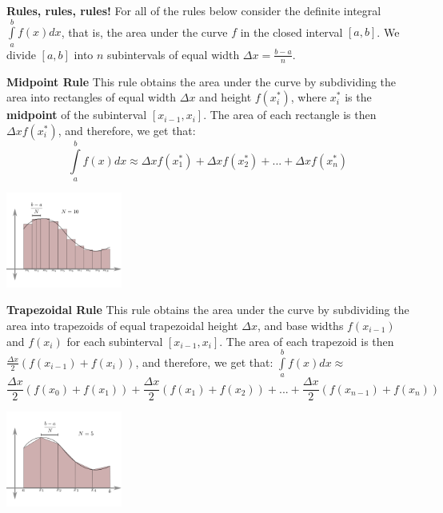 \documentclass[xcolor=dvipsnames]{beamer}
\begin{document}
\begin{frame}[fragile]
{\bf Rules, rules, rules!}
For all of the rules below consider the definite integral $\int\limits_a^b f(x) dx$, that is, the area under the curve $f$ in the closed interval $[a, b]$. We divide $[a, b]$ into $n$ subintervals of equal width $\Delta x = \frac{b - a}{n}$. \\
\end{frame}

\begin{frame}[fragile]
{\bf Midpoint Rule}
This rule obtains the area under the curve by subdividing the area into rectangles of equal width $\Delta x$ and height $f(x^*_i)$, where $x^*_i$ is the {\bf midpoint} of the subinterval $[x_{i-1}, x_i]$. 
\vfill \pause
The area of each rectangle is then  $\displaystyle\Delta x f(x^*_i)$, and therefore, we get that:
\[ \int\limits_a^b f(x) dx \approx \Delta x f(x^*_1) + \Delta x f(x^*_2) + ... + \Delta x f(x^*_n)\]
\begin{center}
\includegraphics[width=1.5in]{MidpointRule.png}
\end{center}
\end{frame}

\begin{frame}[fragile]
{\bf Trapezoidal Rule}
This rule obtains the area under the curve by subdividing the area into trapezoids of equal trapezoidal height $\Delta x$, and base widths $f(x_{i-1})$ and $f(x_i)$ for each subinterval $[x_{i-1}, x_i]$. 
\vfill \pause
The area of each trapezoid is then $\displaystyle\frac{\Delta x}{2}(f(x_{i-1}) + f(x_i))$, and therefore, we get that:
$\int\limits_a^b f(x) dx \approx $ 
\[\frac{\Delta x}{2}(f(x_0) + f(x_1)) + \frac{\Delta x}{2}(f(x_1) + f(x_2)) + ... + \frac{\Delta x}{2}(f(x_{n-1}) + f(x_n))\]
\begin{center}
\includegraphics[width=1.5in]{TrapezoidRule.png}
\end{center}
\end{frame}
\end{document}
